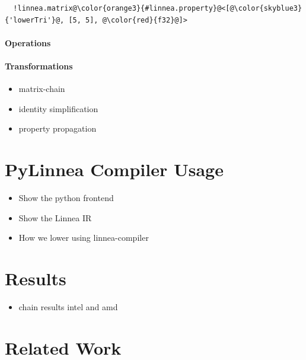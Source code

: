 \documentclass[conference]{IEEEtran}
\begin{document}
\begin{listing}[]
\begin{center}
\begin{minipage}[]{0.5\textwidth}
\begin{verbatim}
  !linnea.matrix@\color{orange3}{#linnea.property}@<[@\color{skyblue3}{'lowerTri'}@, [5, 5], @\color{red}{f32}@]>
\end{verbatim}
\end{minipage}
  \caption{A type to represent a 5 $\times$ 5 lower-triangular matrix with \texttt{f32} as element type.}
\label{lst:type}
\end{center}
\end{listing}

\paragraph{Operations}
\paragraph{Transformations}
\begin{itemize}
  \item matrix-chain
  \item identity simplification
  \item property propagation
\end{itemize}

\section{PyLinnea Compiler Usage}
\begin{itemize}
  \item Show the python frontend
  \item Show the Linnea IR
  \item How we lower using linnea-compiler
\end{itemize}

\section{Results}
\begin{itemize}
  \item chain results intel and amd
\end{itemize}

\section{Related Work}
\end{document}
